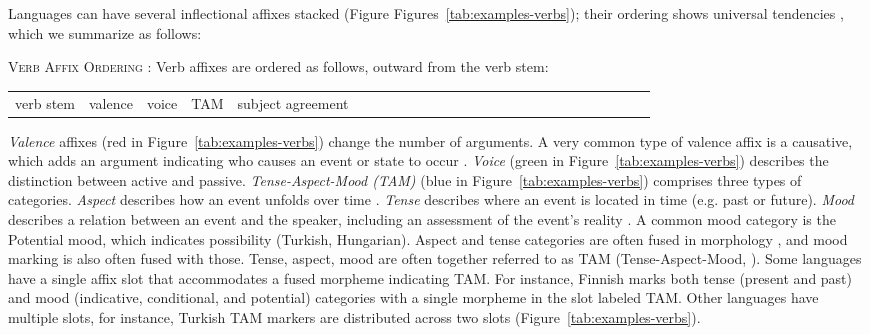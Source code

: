 \documentclass[11pt,letterpaper]{article}
\newcommand{\citep}{\parencite}
\begin{document}
Languages can have several inflectional affixes stacked (Figure Figures~\ref{tab:examples-verbs}); their ordering shows universal tendencies \citep{bybee-morphology-1985}, which we summarize as follows:

\begin{adjustwidth}{6em}{6em}
\textsc{Verb Affix Ordering} \citep{bybee-morphology-1985}:
Verb affixes are ordered as follows, outward from the verb stem:

\begin{tabular}{llllllllllllllllllllllllll}
verb stem & valence & voice & TAM & subject agreement
\end{tabular}
\end{adjustwidth}

\textit{Valence} affixes (red in Figure~\ref{tab:examples-verbs}) change the number of arguments. A very common type of valence affix is a causative, which adds an argument indicating who causes an event or state to occur \citep{wals-111}.
\textit{Voice} (green in Figure~\ref{tab:examples-verbs}) describes the distinction between active and passive. %
\textit{Tense-Aspect-Mood (TAM)} (blue in Figure~\ref{tab:examples-verbs}) comprises three types of categories.
\textit{Aspect} describes how an event unfolds over time \citep{comrie1976aspect,dahl1985tense,binnick1991time}.
\textit{Tense} describes where an event is located in time (e.g. past or future).
\textit{Mood} describes a relation between an event and the speaker, including an assessment of the event's reality \cite{palmer1986mood,portner2018mood}.
A common mood category is the Potential mood, which indicates possibility (Turkish, Hungarian).
Aspect and tense categories are often fused in morphology \citep{binnick2012the}, and mood marking is also often fused with those. %
Tense, aspect, mood are often together referred to as TAM (Tense-Aspect-Mood, \citep{bybee1994the, wals-69}).
Some languages have a single affix slot that accommodates a fused morpheme indicating TAM.
For instance, Finnish marks both tense (present and past) and mood (indicative, conditional, and potential) categories with a single morpheme in the slot labeled TAM.
Other languages have multiple slots, for instance, Turkish TAM markers are distributed across two slots (Figure~\ref{tab:examples-verbs}).
\end{document}
